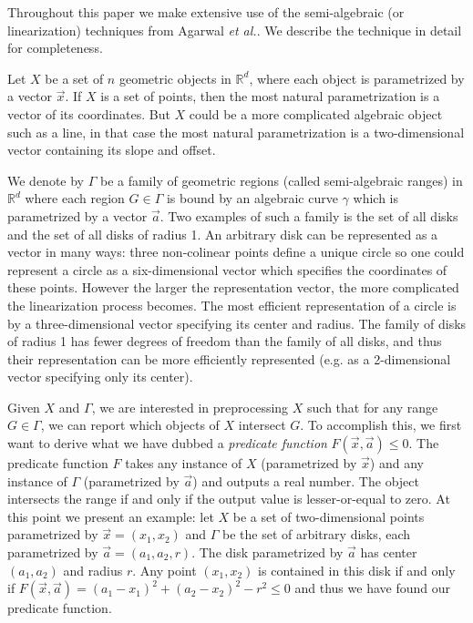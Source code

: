 \documentclass[UKenglish]{lipics-v2019}
\newcommand{\etal}{\textit{et al.}\xspace}
\begin{document}
\label{appx:introduction}

Throughout this paper we make extensive use of the semi-algebraic (or linearization) techniques from Agarwal \etal \cite{agarwal2013range}. 
We describe the technique in detail for completeness.

Let $X$ be a set of $n$ geometric objects in $\mathbb{R}^d$, where each object is parametrized by a vector $\vec{x}$. If $X$ is a set of points, then the most natural parametrization is a vector of its coordinates. But $X$ could be a more complicated algebraic object such as a line, in that case the most natural parametrization is a two-dimensional vector containing its slope and offset.

We denote by $\Gamma$ be a family of geometric regions (called semi-algebraic ranges) in $\mathbb{R}^d$ where each region $G \in \Gamma$ is bound by an algebraic curve $\gamma$ which is parametrized by a vector $\vec{a}$. Two examples of such a family is the set of all disks and the set of all disks of radius 1. An arbitrary disk can be represented as a vector in many ways: three non-colinear points define a unique circle so one could represent a circle as a six-dimensional vector which specifies the coordinates of these points. However the larger the representation vector, the more complicated the linearization process becomes. The most efficient representation of a circle is by a three-dimensional vector specifying its center and radius. The family of disks of radius 1 has fewer degrees of freedom than the family of all disks, and thus their representation can be more efficiently represented (e.g. as a 2-dimensional vector specifying only its center).

Given $X$ and $\Gamma$, we are interested in preprocessing $X$ such that for any range $G \in \Gamma$, we can report which objects of $X$ intersect $G$. To accomplish this, we first want to derive what we have dubbed a \emph{predicate function} $F(\vec{x}, \vec{a}) \le 0$. The predicate function $F$ takes any instance of $X$ (parametrized by $\vec{x}$) and any instance of $\Gamma$ (parametrized by $\vec{a}$) and outputs a real number. The object intersects the range if and only if the output value is lesser-or-equal to zero. At this point we present an example: let $X$ be a set of two-dimensional points parametrized by $\vec{x} = (x_1, x_2)$ and $\Gamma$ be the set of arbitrary disks, each parametrized by $\vec{a} = (a_1, a_2, r)$. The disk parametrized by $\vec{a}$ has center $(a_1, a_2)$ and radius $r$. Any point $(x_1, x_2)$ is contained in this disk if and only if $F(\vec{x}, \vec{a}) = (a_1 - x_1)^2 + (a_2 - x_2)^2 - r^2 \le 0$ and thus we have found our predicate function.
\end{document}
